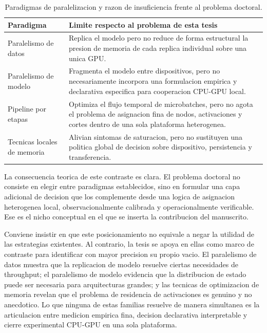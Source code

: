 \begin{table}[t]
\centering
\caption{Paradigmas de paralelizacion y razon de insuficiencia frente al problema doctoral.}
\label{tab:parallelism-paradigms}
\small
\begin{tabularx}{\textwidth}{lX}
\toprule
Paradigma & Limite respecto al problema de esta tesis \\
\midrule
Paralelismo de datos & Replica el modelo pero no reduce de forma estructural la presion de memoria de cada replica individual sobre una unica GPU. \\
Paralelismo de modelo & Fragmenta el modelo entre dispositivos, pero no necesariamente incorpora una formulacion empirica y declarativa especifica para cooperacion CPU-GPU local. \\
Pipeline por etapas & Optimiza el flujo temporal de microbatches, pero no agota el problema de asignacion fina de nodos, activaciones y cortes dentro de una sola plataforma heterogenea. \\
Tecnicas locales de memoria & Alivian sintomas de saturacion, pero no sustituyen una politica global de decision sobre dispositivo, persistencia y transferencia. \\
\bottomrule
\end{tabularx}
\normalsize
\end{table}

La consecuencia teorica de este contraste es clara. El problema doctoral no consiste en elegir entre paradigmas establecidos, sino en formular una capa adicional de decision que los complemente desde una logica de asignacion heterogenea local, observacionalmente calibrada y operacionalmente verificable. Ese es el nicho conceptual en el que se inserta la contribucion del manuscrito.

Conviene insistir en que este posicionamiento no equivale a negar la utilidad de las estrategias existentes. Al contrario, la tesis se apoya en ellas como marco de contraste para identificar con mayor precision su propio vacio. El paralelismo de datos muestra que la replicacion de modelo resuelve ciertas necesidades de throughput; el paralelismo de modelo evidencia que la distribucion de estado puede ser necesaria para arquitecturas grandes; y las tecnicas de optimizacion de memoria revelan que el problema de residencia de activaciones es genuino y no anecdotico. Lo que ninguna de estas familias resuelve de manera simultanea es la articulacion entre medicion empirica fina, decision declarativa interpretable y cierre experimental CPU-GPU en una sola plataforma.

